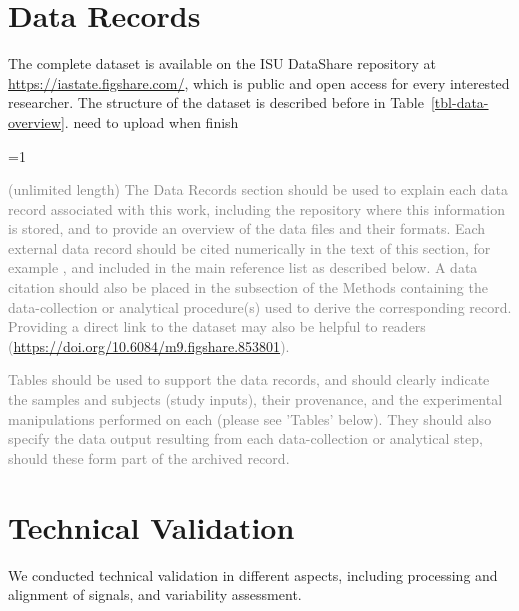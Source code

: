 \documentclass[fleqn,10pt]{wlscirep}
\newcommand{\tom}[1]{{\textcolor{RedOrange}{#1}}}
\newcommand{\ifinstruction}{0} %
\begin{document}
\section*{Data Records}\label{sec-data-records}

The complete dataset is available on the ISU DataShare repository at
\href{https://iastate.figshare.com/}{https://iastate.figshare.com/},
which is public and open access for every interested researcher. The
structure of the dataset is described before in
Table~\ref{tbl-data-overview}. \tom{need to upload when finish}

\ifnum \ifinstruction=1

\textcolor{gray}{(unlimited length) The Data Records section should be used to explain each data record associated with this work, including the repository where this information is stored, and to provide an overview of the data files and their formats. Each external data record should be cited numerically in the text of this section, for example \cite{Hao:gidmaps:2014}, and included in the main reference list as described below. A data citation should also be placed in the subsection of the Methods containing the data-collection or analytical procedure(s) used to derive the corresponding record. Providing a direct link to the dataset may also be helpful to readers (\hyperlink{https://doi.org/10.6084/m9.figshare.853801}{https://doi.org/10.6084/m9.figshare.853801}).}

\textcolor{gray}{Tables should be used to support the data records, and should clearly indicate the samples and subjects (study inputs), their provenance, and the experimental manipulations performed on each (please see 'Tables' below). They should also specify the data output resulting from each data-collection or analytical step, should these form part of the archived record.}
\fi

\section*{Technical Validation}\label{sec-technical-validation}

We conducted technical validation in different aspects, including
processing and alignment of signals, and variability assessment.
\end{document}
